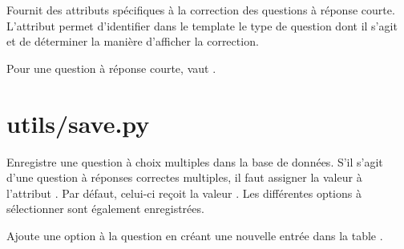 \documentclass[a4,10pt,french]{sphinxmanual}
\begin{document}
\begin{fulllineitems}
\label{source:quiz.utils.correct.CorrectSq}
Fournit des attributs spécifiques à la correction des questions à réponse courte.
L'attribut  permet d'identifier dans le template le type de question
dont il s'agit et de déterminer la manière d'afficher la correction.

Pour une question à réponse courte,  vaut .

\end{fulllineitems}



\section{utils/save.py}
\label{source:utils-save-py}\label{source:module-quiz.utils.save}

\begin{fulllineitems}
\label{source:quiz.utils.save.SaveQcm}
Enregistre une question à choix multiples dans la base de données. S'il s'agit
d'une question à réponses correctes multiples, il faut assigner la valeur 
à l'attribut . Par défaut, celui-ci reçoit la valeur .
Les différentes options à sélectionner sont également enregistrées.

\begin{fulllineitems}
\label{source:quiz.utils.save.SaveQcm.add_option}
Ajoute une option à la question en créant une nouvelle entrée dans la table
.

\end{fulllineitems}


\end{fulllineitems}

\end{document}

